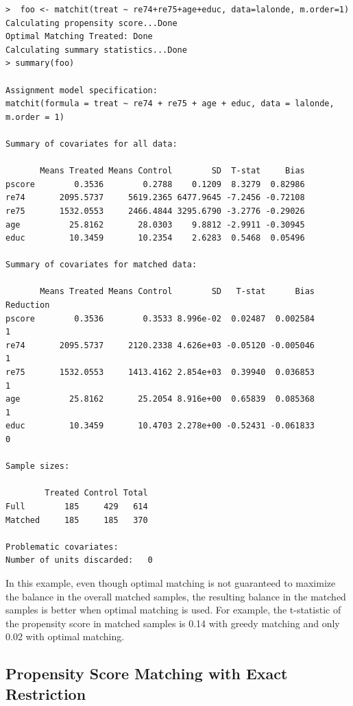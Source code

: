 \documentclass[oneside,letterpaper,titlepage]{article}
\begin{document}
\begin{verbatim}
>  foo <- matchit(treat ~ re74+re75+age+educ, data=lalonde, m.order=1)
Calculating propensity score...Done
Optimal Matching Treated: Done
Calculating summary statistics...Done
> summary(foo)

Assignment model specification:
matchit(formula = treat ~ re74 + re75 + age + educ, data = lalonde,     m.order = 1)

Summary of covariates for all data:

       Means Treated Means Control        SD  T-stat     Bias
pscore        0.3536        0.2788    0.1209  8.3279  0.82986
re74       2095.5737     5619.2365 6477.9645 -7.2456 -0.72108
re75       1532.0553     2466.4844 3295.6790 -3.2776 -0.29026
age          25.8162       28.0303    9.8812 -2.9911 -0.30945
educ         10.3459       10.2354    2.6283  0.5468  0.05496

Summary of covariates for matched data:

       Means Treated Means Control        SD   T-stat      Bias Reduction
pscore        0.3536        0.3533 8.996e-02  0.02487  0.002584         1
re74       2095.5737     2120.2338 4.626e+03 -0.05120 -0.005046         1
re75       1532.0553     1413.4162 2.854e+03  0.39940  0.036853         1
age          25.8162       25.2054 8.916e+00  0.65839  0.085368         1
educ         10.3459       10.4703 2.278e+00 -0.52431 -0.061833         0

Sample sizes:

        Treated Control Total
Full        185     429   614
Matched     185     185   370

Problematic covariates:  
Number of units discarded:   0
\end{verbatim}


In this example, even though optimal matching is not guaranteed to
maximize the balance in the overall matched samples, the resulting
balance in the matched samples is better when optimal matching is
used.  For example, the t-statistic of the propensity score in matched
samples is 0.14 with greedy matching and only 0.02 with optimal
matching.

\subsection{Propensity Score Matching with Exact Restriction}
\end{document}
